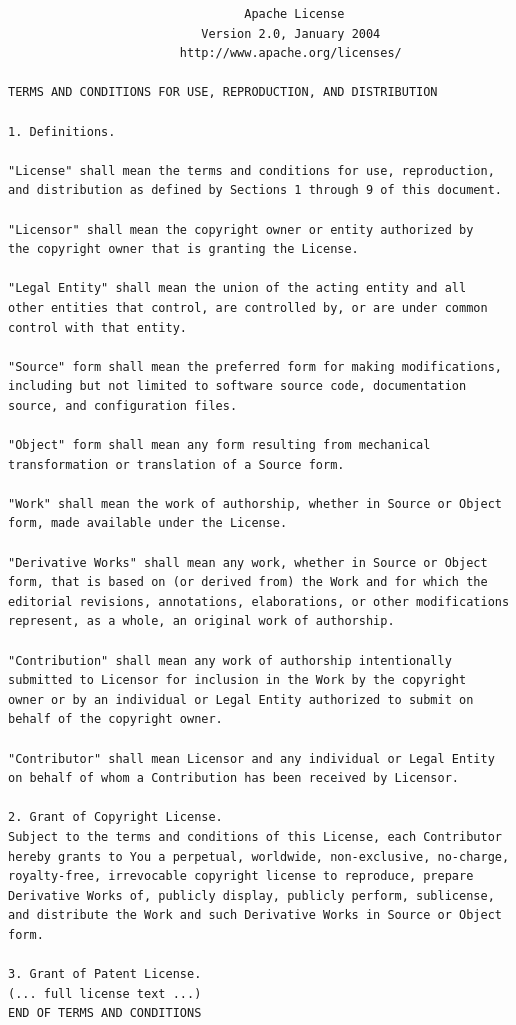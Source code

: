 \documentclass[12pt,oneside]{article}
\begin{document}
\begin{small}
\begin{verbatim}
                                 Apache License
                           Version 2.0, January 2004
                        http://www.apache.org/licenses/

TERMS AND CONDITIONS FOR USE, REPRODUCTION, AND DISTRIBUTION

1. Definitions.

"License" shall mean the terms and conditions for use, reproduction,
and distribution as defined by Sections 1 through 9 of this document.

"Licensor" shall mean the copyright owner or entity authorized by
the copyright owner that is granting the License.

"Legal Entity" shall mean the union of the acting entity and all
other entities that control, are controlled by, or are under common
control with that entity.

"Source" form shall mean the preferred form for making modifications,
including but not limited to software source code, documentation
source, and configuration files.

"Object" form shall mean any form resulting from mechanical
transformation or translation of a Source form.

"Work" shall mean the work of authorship, whether in Source or Object
form, made available under the License.

"Derivative Works" shall mean any work, whether in Source or Object
form, that is based on (or derived from) the Work and for which the
editorial revisions, annotations, elaborations, or other modifications
represent, as a whole, an original work of authorship.

"Contribution" shall mean any work of authorship intentionally
submitted to Licensor for inclusion in the Work by the copyright
owner or by an individual or Legal Entity authorized to submit on
behalf of the copyright owner.

"Contributor" shall mean Licensor and any individual or Legal Entity
on behalf of whom a Contribution has been received by Licensor.

2. Grant of Copyright License.
Subject to the terms and conditions of this License, each Contributor
hereby grants to You a perpetual, worldwide, non-exclusive, no-charge,
royalty-free, irrevocable copyright license to reproduce, prepare
Derivative Works of, publicly display, publicly perform, sublicense,
and distribute the Work and such Derivative Works in Source or Object
form.

3. Grant of Patent License.
(... full license text ...)
END OF TERMS AND CONDITIONS
\end{verbatim}
\end{small}
\end{document}
